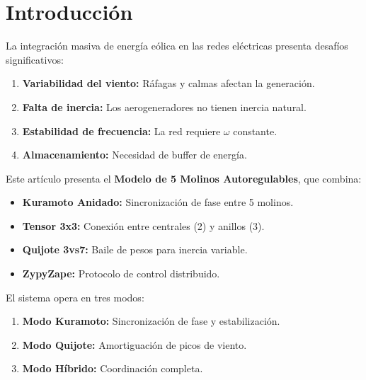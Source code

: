 \documentclass[12pt,a4paper]{article}
\begin{document}
\tableofcontents
\newpage

\section{Introducción}

La integración masiva de energía eólica en las redes eléctricas presenta desafíos significativos:

\begin{enumerate}[label=(\arabic*)]
    \item \textbf{Variabilidad del viento:} Ráfagas y calmas afectan la generación.
    \item \textbf{Falta de inercia:} Los aerogeneradores no tienen inercia natural.
    \item \textbf{Estabilidad de frecuencia:} La red requiere $\omega$ constante.
    \item \textbf{Almacenamiento:} Necesidad de buffer de energía.
\end{enumerate}

Este artículo presenta el \textbf{Modelo de 5 Molinos Autoregulables}, que combina:

\begin{itemize}
    \item \textbf{Kuramoto Anidado:} Sincronización de fase entre 5 molinos.
    \item \textbf{Tensor 3x3:} Conexión entre centrales (2) y anillos (3).
    \item \textbf{Quijote 3vs7:} Baile de pesos para inercia variable.
    \item \textbf{ZypyZape:} Protocolo de control distribuido.
\end{itemize}

El sistema opera en tres modos:

\begin{enumerate}[label=(\alph*)]
    \item \textbf{Modo Kuramoto:} Sincronización de fase y estabilización.
    \item \textbf{Modo Quijote:} Amortiguación de picos de viento.
    \item \textbf{Modo Híbrido:} Coordinación completa.
\end{enumerate}
\end{document}
